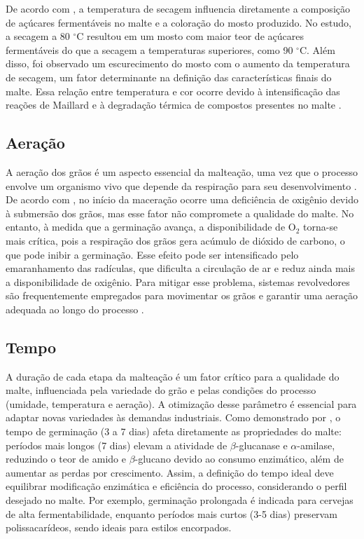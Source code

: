 De acordo com , a temperatura de secagem influencia diretamente a composição de açúcares fermentáveis no malte e a coloração do mosto produzido. No estudo, a secagem a 80 $^{\circ}$C resultou em um mosto com maior teor de açúcares fermentáveis do que a secagem a temperaturas superiores, como 90 $^{\circ}$C. Além disso, foi observado um escurecimento do mosto com o aumento da temperatura de secagem, um fator determinante na definição das características finais do malte. Essa relação entre temperatura e cor ocorre devido à intensificação das reações de Maillard e à degradação térmica de compostos presentes no malte \cite{KUNZE1996}.

\subsection{Aeração}

A aeração dos grãos é um aspecto essencial da malteação, uma vez que o processo envolve um organismo vivo que depende da respiração para seu desenvolvimento \cite{MALLETT2022}. De acordo com , no início da maceração ocorre uma deficiência de oxigênio devido à submersão dos grãos, mas esse fator não compromete a qualidade do malte. No entanto, à medida que a germinação avança, a disponibilidade de O$_2$ torna-se mais crítica, pois a respiração dos grãos gera acúmulo de dióxido de carbono, o que pode inibir a germinação. Esse efeito pode ser intensificado pelo emaranhamento das radículas, que dificulta a circulação de ar e reduz ainda mais a disponibilidade de oxigênio. Para mitigar esse problema, sistemas revolvedores são frequentemente empregados para movimentar os grãos e garantir uma aeração adequada ao longo do processo \cite{CENCI2021}. 

\subsection{Tempo}
A duração de cada etapa da malteação é um fator crítico para a qualidade do malte, influenciada pela variedade do grão e pelas condições do processo (umidade, temperatura e aeração). A otimização desse parâmetro é essencial para adaptar novas variedades às demandas industriais. Como demonstrado por , o tempo de germinação (3 a 7 dias) afeta diretamente as propriedades do malte: períodos mais longos (7 dias) elevam a atividade de $\beta$-glucanase e $\alpha$-amilase, reduzindo o teor de amido e $\beta$-glucano devido ao consumo enzimático, além de aumentar as perdas por crescimento. Assim, a definição do tempo ideal deve equilibrar modificação enzimática e eficiência do processo, considerando o perfil desejado no malte. Por exemplo, germinação prolongada é indicada para cervejas de alta fermentabilidade, enquanto períodos mais curtos (3-5 dias) preservam polissacarídeos, sendo ideais para estilos encorpados.

